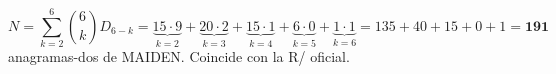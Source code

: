 \documentclass[11pt]{article}
\begin{document}
\begin{resp}
\[
N=\sum_{k=2}^{6}\binom{6}{k}D_{6-k}
=\underbrace{15\cdot 9}_{k=2}+\underbrace{20\cdot 2}_{k=3}+\underbrace{15\cdot 1}_{k=4}+\underbrace{6\cdot 0}_{k=5}+\underbrace{1\cdot 1}_{k=6}
=135+40+15+0+1=\mathbf{191}
\]
anagramas-dos de MAIDEN. Coincide con la R/ oficial.
\end{resp}
\end{document}
